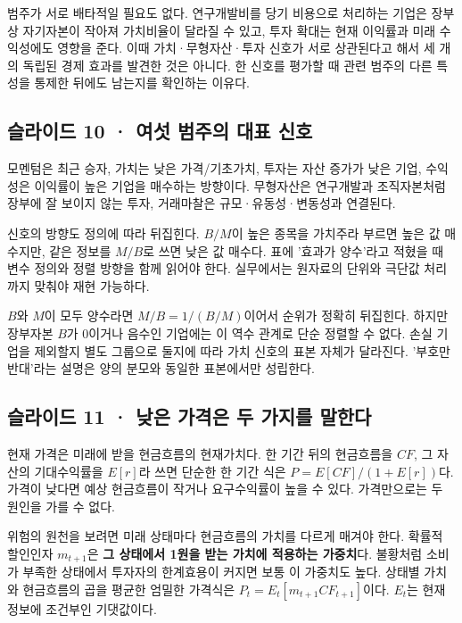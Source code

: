 \documentclass[11pt,a4paper]{article}
\begin{document}
범주가 서로 배타적일 필요도 없다. 연구개발비를 당기 비용으로 처리하는 기업은 장부상 자기자본이 작아져 가치비율이 달라질 수 있고, 투자 확대는 현재 이익률과 미래 수익성에도 영향을 준다. 이때 가치·무형자산·투자 신호가 서로 상관된다고 해서 세 개의 독립된 경제 효과를 발견한 것은 아니다. 한 신호를 평가할 때 관련 범주의 다른 특성을 통제한 뒤에도 남는지를 확인하는 이유다.\par

\subsection{슬라이드 10 · 여섯 범주의 대표 신호}
모멘텀은 최근 승자, 가치는 낮은 가격/기초가치, 투자는 자산 증가가 낮은 기업, 수익성은 이익률이 높은 기업을 매수하는 방향이다. 무형자산은 연구개발과 조직자본처럼 장부에 잘 보이지 않는 투자, 거래마찰은 규모·유동성·변동성과 연결된다.\par

신호의 방향도 정의에 따라 뒤집힌다. $B/M$이 높은 종목을 가치주라 부르면 높은 값 매수지만, 같은 정보를 $M/B$로 쓰면 낮은 값 매수다. 표에 '효과가 양수'라고 적혔을 때 변수 정의와 정렬 방향을 함께 읽어야 한다. 실무에서는 원자료의 단위와 극단값 처리까지 맞춰야 재현 가능하다.\par

$B$와 $M$이 모두 양수라면 $M/B=1/(B/M)$이어서 순위가 정확히 뒤집힌다. 하지만 장부자본 $B$가 0이거나 음수인 기업에는 이 역수 관계로 단순 정렬할 수 없다. 손실 기업을 제외할지 별도 그룹으로 둘지에 따라 가치 신호의 표본 자체가 달라진다. '부호만 반대'라는 설명은 양의 분모와 동일한 표본에서만 성립한다.\par

\subsection{슬라이드 11 · 낮은 가격은 두 가지를 말한다}
현재 가격은 미래에 받을 현금흐름의 현재가치다. 한 기간 뒤의 현금흐름을 $CF$, 그 자산의 기대수익률을 $E[r]$라 쓰면 단순한 한 기간 식은 $P=E[CF]/(1+E[r])$다. 가격이 낮다면 예상 현금흐름이 작거나 요구수익률이 높을 수 있다. 가격만으로는 두 원인을 가를 수 없다.\par

위험의 원천을 보려면 미래 상태마다 현금흐름의 가치를 다르게 매겨야 한다. 확률적 할인인자 $m_{t+1}$은 \textbf{그 상태에서 1원을 받는 가치에 적용하는 가중치}다. 불황처럼 소비가 부족한 상태에서 투자자의 한계효용이 커지면 보통 이 가중치도 높다. 상태별 가치와 현금흐름의 곱을 평균한 엄밀한 가격식은 $P_t=E_t[m_{t+1}CF_{t+1}]$이다. $E_t$는 현재 정보에 조건부인 기댓값이다.\par
\end{document}
